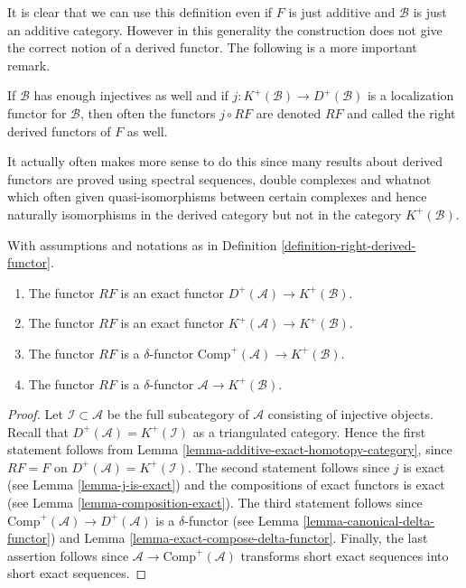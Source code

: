\noindent
It is clear that we can use this definition even if $F$ is just additive
and $\mathcal{B}$ is just an additive category. However in this generality
the construction does not give the correct notion of a derived functor.
The following is a more important remark.

\begin{remark}
\label{remark-right-derived-functor}
If $\mathcal{B}$ has enough injectives as well and if
$j : K^{+}(\mathcal{B}) \to D^{+}(\mathcal{B})$ is a localization functor
for $\mathcal{B}$, then often the functors $j \circ RF$ are denoted
$RF$ and called the right derived functors of $F$ as well.
\end{remark}

\noindent
It actually often makes more sense to do this since many results about
derived functors are proved using spectral sequences, double complexes
and whatnot which often given quasi-isomorphisms between certain complexes
and hence naturally isomorphisms in the derived category but not in the
category $K^{+}(\mathcal{B})$.

\begin{lemma}
\label{lemma-right-derived-properties}
With assumptions and notations as in
Definition \ref{definition-right-derived-functor}.
\begin{enumerate}
\item The functor $RF$ is an exact functor
$D^{+}(\mathcal{A}) \to K^{+}(\mathcal{B})$.
\item The functor $RF$ is an exact functor
$K^{+}(\mathcal{A}) \to K^{+}(\mathcal{B})$.
\item The functor $RF$ is a $\delta$-functor
$\text{Comp}^{+}(\mathcal{A}) \to K^{+}(\mathcal{B})$.
\item The functor $RF$ is a $\delta$-functor
$\mathcal{A} \to K^{+}(\mathcal{B})$.
\end{enumerate}
\end{lemma}

\begin{proof}
Let $\mathcal{I} \subset \mathcal{A}$ be the full subcategory of $\mathcal{A}$
consisting of injective objects. Recall that
$D^{+}(\mathcal{A}) = K^{+}(\mathcal{I})$ as a triangulated category.
Hence the first statement follows from
Lemma \ref{lemma-additive-exact-homotopy-category}, since
$RF = F$ on $D^{+}(\mathcal{A}) = K^{+}(\mathcal{I})$.
The second statement follows since
$j$ is exact (see Lemma \ref{lemma-j-is-exact}) and the compositions of exact
functors is exact (see Lemma \ref{lemma-composition-exact}).
The third statement follows since
$\text{Comp}^{+}(\mathcal{A}) \to D^{+}(\mathcal{A})$ is a $\delta$-functor
(see Lemma \ref{lemma-canonical-delta-functor})
and Lemma \ref{lemma-exact-compose-delta-functor}.
Finally, the last assertion follows since
$\mathcal{A} \to \text{Comp}^{+}(\mathcal{A})$
transforms short exact sequences into short exact sequences.
\end{proof}

